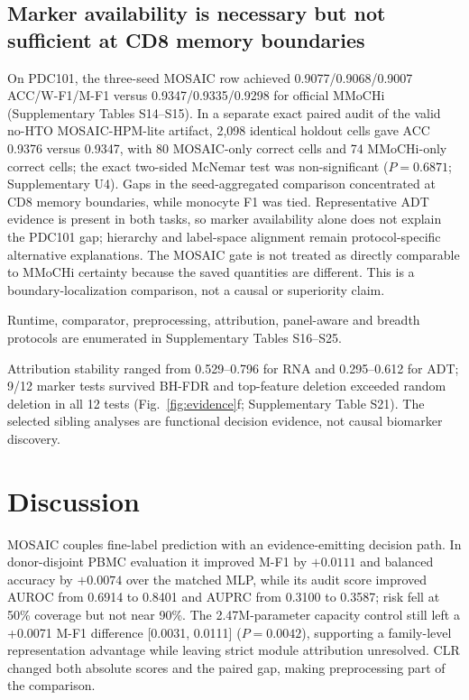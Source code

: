 \documentclass[unnumsec,webpdf,contemporary,large,numbered]{oup-authoring-template}
\begin{document}
\subsection{Marker availability is necessary but not sufficient at CD8 memory boundaries}

On PDC101, the three-seed MOSAIC row achieved 0.9077/0.9068/0.9007 ACC/W-F1/M-F1 versus 0.9347/0.9335/0.9298 for official MMoCHi (Supplementary Tables S14--S15). In a separate exact paired audit of the valid no-HTO MOSAIC-HPM-lite artifact, 2,098 identical holdout cells gave ACC 0.9376 versus 0.9347, with 80 MOSAIC-only correct cells and 74 MMoCHi-only correct cells; the exact two-sided McNemar test was non-significant ($P=0.6871$; Supplementary U4). Gaps in the seed-aggregated comparison concentrated at CD8 memory boundaries, while monocyte F1 was tied. Representative ADT evidence is present in both tasks, so marker availability alone does not explain the PDC101 gap; hierarchy and label-space alignment remain protocol-specific alternative explanations. The MOSAIC gate is not treated as directly comparable to MMoCHi certainty because the saved quantities are different. This is a boundary-localization comparison, not a causal or superiority claim.

Runtime, comparator, preprocessing, attribution, panel-aware and breadth protocols are enumerated in Supplementary Tables S16--S25.

Attribution stability ranged from 0.529--0.796 for RNA and 0.295--0.612 for ADT; 9/12 marker tests survived BH-FDR and top-feature deletion exceeded random deletion in all 12 tests (Fig.~\ref{fig:evidence}f; Supplementary Table S21). The selected sibling analyses are functional decision evidence, not causal biomarker discovery.

\section{Discussion}

MOSAIC couples fine-label prediction with an evidence-emitting decision path. In donor-disjoint PBMC evaluation it improved M-F1 by $+0.0111$ and balanced accuracy by $+0.0074$ over the matched MLP, while its audit score improved AUROC from 0.6914 to 0.8401 and AUPRC from 0.3100 to 0.3587; risk fell at 50\% coverage but not near 90\%. The 2.47M-parameter capacity control still left a +0.0071 M-F1 difference [0.0031, 0.0111] ($P=0.0042$), supporting a family-level representation advantage while leaving strict module attribution unresolved. CLR changed both absolute scores and the paired gap, making preprocessing part of the comparison.
\end{document}
